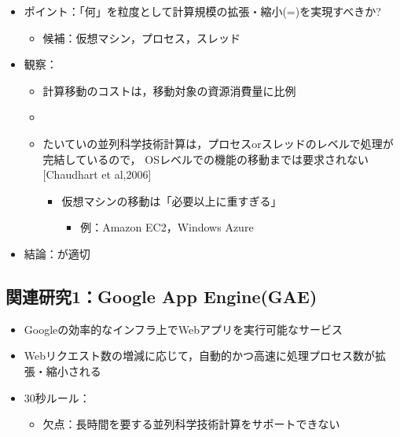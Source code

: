 \documentclass[25pt,papersize,landscape]{jsarticle}
\begin{document}
\begin{itemize}
\item ポイント：「何」を粒度として計算規模の拡張・縮小(=)を実現すべきか?
  \begin{itemize}
  \item 候補：仮想マシン，プロセス，スレッド
  \end{itemize}
\item 観察：
  \begin{itemize}
  \item 計算移動のコストは，移動対象の資源消費量に比例
  \item {}
  \item たいていの並列科学技術計算は，プロセスorスレッドのレベルで処理が完結しているので，
    OSレベルでの機能の移動までは要求されない{\scriptsize[Chaudhart et al,2006]}
    \begin{itemize}
    \item 仮想マシンの移動は「必要以上に重すぎる」
      \begin{itemize}
      \item 例：Amazon EC2，Windows Azure
      \end{itemize}
    \end{itemize}
  \end{itemize}
\item 結論：が適切
\end{itemize}

\subsection{関連研究1：Google App Engine(GAE)}

\begin{itemize}
\item Googleの効率的なインフラ上でWebアプリを実行可能なサービス
\item Webリクエスト数の増減に応じて，自動的かつ高速に処理プロセス数が拡張・縮小される
\item 30秒ルール：
  \begin{itemize}
  \item 欠点：長時間を要する並列科学技術計算をサポートできない
  \end{itemize}
\end{itemize}

\end{document}
